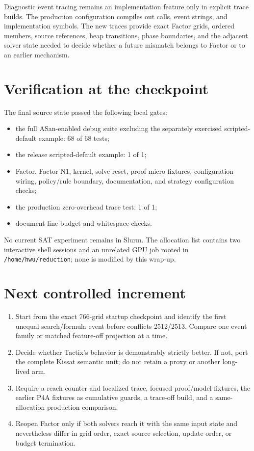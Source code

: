 \documentclass[11pt]{article}
\newcommand{\code}[1]{\nolinkurl{#1}}
\newcommand{\tactix}{Tactix}
\newcommand{\kissat}{Kissat}
\begin{document}
Diagnostic event tracing remains an implementation feature only in explicit
trace builds.  The production configuration compiles out calls, event strings,
and implementation symbols.  The new traces provide exact Factor grids,
ordered members, source references, heap transitions, phase boundaries, and
the adjacent solver state needed to decide whether a future mismatch belongs
to Factor or to an earlier mechanism.

\section{Verification at the checkpoint}

The final source state passed the following local gates:

\begin{itemize}[leftmargin=*,itemsep=2pt]
  \item the full ASan-enabled debug suite excluding the separately exercised
  scripted-default example: 68 of 68 tests;
  \item the release scripted-default example: 1 of 1;
  \item Factor, Factor-N1, kernel, solve-reset, proof micro-fixtures,
  configuration wiring, policy/rule boundary, documentation, and strategy
  configuration checks;
  \item the production zero-overhead trace test: 1 of 1;
  \item document line-budget and whitespace checks.
\end{itemize}

No current SAT experiment remains in Slurm.  The allocation list contains two
interactive shell sessions and an unrelated GPU job rooted in
\code{/home/hwu/reduction}; none is modified by this wrap-up.

\section{Next controlled increment}

\begin{enumerate}[leftmargin=*,itemsep=3pt]
  \item Start from the exact 766-grid startup checkpoint and identify the
  first unequal search/formula event before conflicts 2512/2513.  Compare one
  event family or matched feature-off projection at a time.
  \item Decide whether \tactix{}'s behavior is demonstrably strictly better.
  If not, port the complete \kissat{} semantic unit; do not retain a proxy or
  another long-lived arm.
  \item Require a reach counter and localized trace, focused proof/model
  fixtures, the earlier P4A fixtures as cumulative guards, a trace-off build,
  and a same-allocation production comparison.
  \item Reopen Factor only if both solvers reach it with the same input state
  and nevertheless differ in grid order, exact source selection, update
  order, or budget termination.
\end{enumerate}
\end{document}
